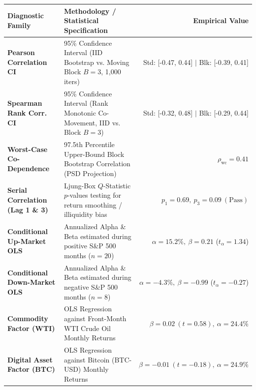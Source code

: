 \documentclass[10pt,a4paper]{article}
\begin{document}
\vspace{0.45em}

\begin{tcolorbox}[colback=white, colframe=primary, title=\textbf{\small\strut Appendix A: Extended Statistical, Bootstrap \& Factor Diagnostics}, fonttitle=\sffamily\bfseries\small, arc=5pt, boxrule=0.8pt, toptitle=4pt, bottomtitle=4pt, left=6pt, right=6pt, top=3.5pt, bottom=3.5pt, colbacktitle=primary]
\renewcommand{\arraystretch}{1.22}
\scriptsize
\begin{tabularx}{\textwidth}{l X r}
\toprule
\textbf{\textcolor{primary}{Diagnostic Family}} & \textbf{\textcolor{primary}{Methodology / Statistical Specification}} & \textbf{\textcolor{primary}{Empirical Value}} \\
\midrule
\textbf{Pearson Correlation CI} & 95\% Confidence Interval (IID Bootstrap vs. Moving Block $B=3$, 1,000 iters) & Std: [-0.47, 0.44] $\vert$ Blk: [-0.39, 0.41] \\
\rowcolor{cardbg} \textbf{Spearman Rank Corr. CI} & 95\% Confidence Interval (Rank Monotonic Co-Movement, IID vs. Block $B=3$) & Std: [-0.32, 0.48] $\vert$ Blk: [-0.29, 0.44] \\
\textbf{Worst-Case Co-Dependence} & 97.5th Percentile Upper-Bound Block Bootstrap Correlation (PSD Projection) & $\rho_{\text{wc}} = 0.41$ \\
\rowcolor{cardbg} \textbf{Serial Correlation (Lag 1 \& 3)} & Ljung-Box $Q$-Statistic $p$-values testing for return smoothing / illiquidity bias & $p_1=0.69,\ p_3=0.09\ (\text{Pass})$ \\
\textbf{Conditional Up-Market OLS} & Annualized Alpha \& Beta estimated during positive S\&P 500 months ($n=20$) & $\alpha=15.2\%,\ \beta=0.21$ ($t_\alpha=1.34$) \\
\rowcolor{cardbg} \textbf{Conditional Down-Market OLS} & Annualized Alpha \& Beta estimated during negative S\&P 500 months ($n=8$) & $\alpha=-4.3\%,\ \beta=-0.99$ ($t_\alpha=-0.27$) \\
\textbf{Commodity Factor (WTI)} & OLS Regression against Front-Month WTI Crude Oil Monthly Returns & $\beta=0.02\ (t=0.58),\ \alpha=24.4\%$ \\
\rowcolor{cardbg} \textbf{Digital Asset Factor (BTC)} & OLS Regression against Bitcoin (BTC-USD) Monthly Returns & $\beta=-0.01\ (t=-0.18),\ \alpha=24.9\%$ \\
\bottomrule
\end{tabularx}
\end{tcolorbox}
\end{document}

